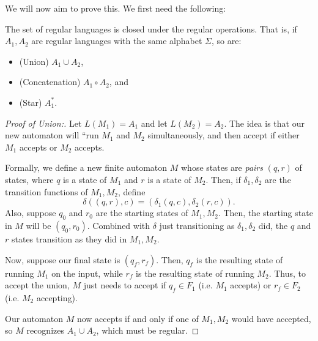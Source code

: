 We will now aim to prove this. We first need the following:

\begin{lem}
	[Closure]
	The set of regular languages is closed under the regular operations. 
	That is, if $A_1, A_2$ are regular languages with the same alphabet $\Sigma$, so are:
	\begin{itemize}
		\item (Union) $A_1\cup A_2$,
		\item (Concatenation) $A_1\circ A_2$, and
		\item (Star) $A_1^*$.
	\end{itemize}
\end{lem}

\begin{proof}
	[Proof of Union:] Let $L(M_1) = A_1$ and let $L(M_2) = A_2$. The idea is that our new automaton will ``run $M_1$ and $M_2$ simultaneously, and then accept if either $M_1$ accepts or $M_2$ accepts.

	Formally, we define a new finite automaton $M$ whose states are \emph{pairs} $(q, r)$ of states, where $q$ is a state of $M_1$ and $r$ is a state of $M_2$.
	Then, if $\delta_1, \delta_2$ are the transition functions of $M_1, M_2$, define \[
		\delta((q,r), c) = (\delta_1(q,c), \delta_2(r,c)).
	\]
	Also, suppose $q_0$ and $r_0$ are the starting states of $M_1, M_2$. Then, the starting state in $M$ will be $(q_0, r_0)$.
	Combined with $\delta$ just transitioning as $\delta_1, \delta_2$ did, the $q$ and $r$ states transition as they did in $M_1, M_2$. 

	Now, suppose our final state is $(q_f, r_f)$. Then, $q_f$ is the resulting state of running $M_1$ on the input, while $r_f$ is the resulting state of running $M_2$. Thus, to accept the union, $M$ just needs to accept if $q_f\in F_1$ (i.e. $M_1$ accepts) or $r_f\in F_2$ (i.e. $M_2$ accepting).

	Our automaton $M$ now accepts if and only if one of $M_1, M_2$ would have accepted, so $M$ recognizes $A_1\cup A_2$, which must be regular.
\end{proof}


